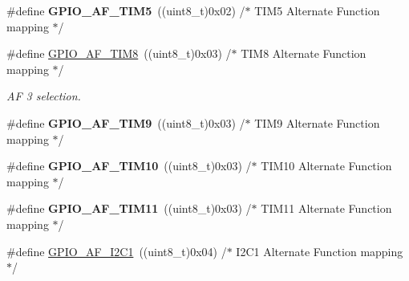 \begin{DoxyCompactItemize}
\item 
\#define {\bfseries G\+P\+I\+O\+\_\+\+A\+F\+\_\+\+T\+I\+M5}~((uint8\+\_\+t)0x02)  /$\ast$ T\+I\+M5 Alternate Function mapping $\ast$/\hypertarget{group___g_p_i_o___alternat__function__selection__define_gad1abee116e98620ade37334e649e6006}{}\label{group___g_p_i_o___alternat__function__selection__define_gad1abee116e98620ade37334e649e6006}

\item 
\#define \hyperlink{group___g_p_i_o___alternat__function__selection__define_gaf7562d5cf5d33dbc7b7c69df63182583}{G\+P\+I\+O\+\_\+\+A\+F\+\_\+\+T\+I\+M8}~((uint8\+\_\+t)0x03)  /$\ast$ T\+I\+M8 Alternate Function mapping $\ast$/\hypertarget{group___g_p_i_o___alternat__function__selection__define_gaf7562d5cf5d33dbc7b7c69df63182583}{}\label{group___g_p_i_o___alternat__function__selection__define_gaf7562d5cf5d33dbc7b7c69df63182583}

\begin{DoxyCompactList}\small\item\em AF 3 selection. \end{DoxyCompactList}\item 
\#define {\bfseries G\+P\+I\+O\+\_\+\+A\+F\+\_\+\+T\+I\+M9}~((uint8\+\_\+t)0x03)  /$\ast$ T\+I\+M9 Alternate Function mapping $\ast$/\hypertarget{group___g_p_i_o___alternat__function__selection__define_ga6c7cfbf2f21945814c6526a7bacb1384}{}\label{group___g_p_i_o___alternat__function__selection__define_ga6c7cfbf2f21945814c6526a7bacb1384}

\item 
\#define {\bfseries G\+P\+I\+O\+\_\+\+A\+F\+\_\+\+T\+I\+M10}~((uint8\+\_\+t)0x03)  /$\ast$ T\+I\+M10 Alternate Function mapping $\ast$/\hypertarget{group___g_p_i_o___alternat__function__selection__define_ga3881c36c71f0cbd7efacb424b39cd9f4}{}\label{group___g_p_i_o___alternat__function__selection__define_ga3881c36c71f0cbd7efacb424b39cd9f4}

\item 
\#define {\bfseries G\+P\+I\+O\+\_\+\+A\+F\+\_\+\+T\+I\+M11}~((uint8\+\_\+t)0x03)  /$\ast$ T\+I\+M11 Alternate Function mapping $\ast$/\hypertarget{group___g_p_i_o___alternat__function__selection__define_gaeb30ba1cb15de0d4af78933e9dcfd033}{}\label{group___g_p_i_o___alternat__function__selection__define_gaeb30ba1cb15de0d4af78933e9dcfd033}

\item 
\#define \hyperlink{group___g_p_i_o___alternat__function__selection__define_gaa246f87c460c4bb4036b8ab39e0220f1}{G\+P\+I\+O\+\_\+\+A\+F\+\_\+\+I2\+C1}~((uint8\+\_\+t)0x04)  /$\ast$ I2\+C1 Alternate Function mapping $\ast$/\hypertarget{group___g_p_i_o___alternat__function__selection__define_gaa246f87c460c4bb4036b8ab39e0220f1}{}\label{group___g_p_i_o___alternat__function__selection__define_gaa246f87c460c4bb4036b8ab39e0220f1}


\end{DoxyCompactItemize}

